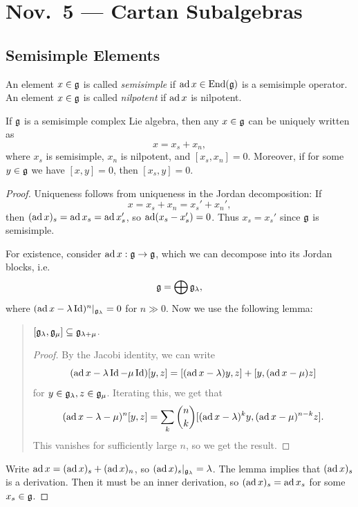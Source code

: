 \chapter{Nov.~5 --- Cartan Subalgebras}

\section{Semisimple Elements}

\begin{definition}
  An element $x \in \mathfrak{g}$ is called
  \emph{semisimple} if $\operatorname{ad} x \in \operatorname{End}(\mathfrak{g})$
  is a semisimple operator. An
  element $x \in \mathfrak{g}$ is called
  \emph{nilpotent} if $\operatorname{ad} x$ is
  nilpotent.
\end{definition}

\begin{theorem}
  If $\mathfrak{g}$ is a semisimple complex Lie
  algebra, then any $x \in \mathfrak{g}$ can be
  uniquely written as
  \[
    x = x_s + x_n,
  \]
  where $x_s$ is semisimple,
  $x_n$ is nilpotent, and
  $[x_s, x_n] = 0$. Moreover, if for
  some $y \in \mathfrak{g}$ we have
  $[x, y] = 0$, then $[x_s, y] = 0$.
\end{theorem}

\begin{proof}
  Uniqueness follows from uniqueness
  in the Jordan decomposition: If
  \[
    x = x_s + x_n = x_s' + x_n',
  \]
  then
  $(\operatorname{ad} x)_s = \operatorname{ad} x_s = \operatorname{ad} x_s'$, so
  $\operatorname{ad}(x_s - x_s') = 0$. Thus
  $x_s = x_s'$ since $\mathfrak{g}$ is semisimple.

  For existence, consider
  $\operatorname{ad} x : \mathfrak{g} \to \mathfrak{g}$, which we can
  decompose into its Jordan blocks, i.e.
  \[
    \mathfrak{g} = \bigoplus \mathfrak{g}_\lambda,
  \]
  where $(\operatorname{ad} x - \lambda \operatorname{Id})^n|_{\mathfrak{g}_\lambda} = 0$
  for $n \gg 0$. Now we use the following
  lemma:
  \begin{quote}
    \vspace{-2em}
    \begin{lemma}
      $[\mathfrak{g}_{\lambda}, \mathfrak{g}_{\mu}] \subseteq \mathfrak{g}_{\lambda + \mu}$.
    \end{lemma}

    \begin{proof}
      By the Jacobi identity, we can write
      \[
        (\operatorname{ad} x - \lambda \operatorname{Id} - \mu \operatorname{Id})
        [y, z]
        = [(\operatorname{ad} x - \lambda) y, z]
        + [y, (\operatorname{ad} x - \mu) z]
      \]
      for $y \in \mathfrak{g}_\lambda, z \in \mathfrak{g}_\mu$.
      Iterating this, we get that
      \[
        (\operatorname{ad} x - \lambda - \mu)^n[y, z]
        = \sum_{k} \binom{n}{k}
        [(\operatorname{ad} x - \lambda)^k y,
        (\operatorname{ad} x - \mu)^{n - k} z].
      \]
      This vanishes for sufficiently
      large $n$, so we get the result.
    \end{proof}
  \end{quote}
  Write
  $\operatorname{ad} x = (\operatorname{ad} x)_s + (\operatorname{ad} x)_n$, so
  $(\operatorname{ad} x)_s|_{\mathfrak{g}_\lambda} = \lambda$. The
  lemma implies that
  $(\operatorname{ad} x)_s$ is a derivation. Then
  it must be an inner derivation, so
  $(\operatorname{ad} x)_s = \operatorname{ad} x_s$ for some
  $x_s \in \mathfrak{g}$.
\end{proof}

